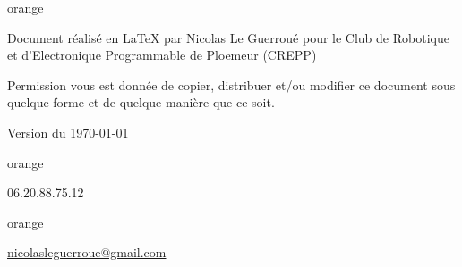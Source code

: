 
\begin{items}{orange}{\Triangle}
\item Document réalisé en \LaTeX{} par Nicolas Le Guerroué 
pour le Club de Robotique et d'Electronique Programmable de Ploemeur (CREPP) 
\item Permission vous est donnée de copier, distribuer et/ou modifier ce document sous quelque forme et de quelque manière que ce soit.
\item Version du \today
\end{items}


\begin{items}{orange}{\faPhone}
    \item 06.20.88.75.12
\end{items}

\begin{items}{orange}{\faEnvelope}
    \item \href{mailto:nicolasleguerroue@gmail.com}{nicolasleguerroue@gmail.com}
\end{items}
